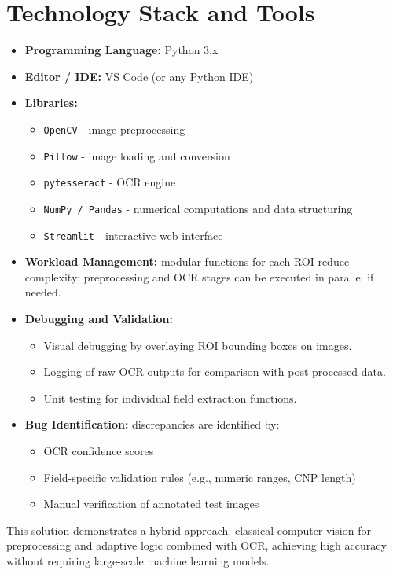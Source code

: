 \documentclass[runningheads,a4paper,11pt]{report}
\begin{document}
\section{Technology Stack and Tools}
\begin{itemize}
\item \textbf{Programming Language:} Python 3.x
\item \textbf{Editor / IDE:} VS Code (or any Python IDE)
\item \textbf{Libraries:} 
  \begin{itemize}
  \item \texttt{OpenCV} - image preprocessing
  \item \texttt{Pillow} - image loading and conversion
  \item \texttt{pytesseract} - OCR engine
  \item \texttt{NumPy / Pandas} - numerical computations and data structuring
  \item \texttt{Streamlit} - interactive web interface
  \end{itemize}
\item \textbf{Workload Management:} modular functions for each ROI reduce complexity; preprocessing and OCR stages can be executed in parallel if needed.
\item \textbf{Debugging and Validation:} 
  \begin{itemize}
  \item Visual debugging by overlaying ROI bounding boxes on images.
  \item Logging of raw OCR outputs for comparison with post-processed data.
  \item Unit testing for individual field extraction functions.
  \end{itemize}
\item \textbf{Bug Identification:} discrepancies are identified by:
  \begin{itemize}
  \item OCR confidence scores
  \item Field-specific validation rules (e.g., numeric ranges, CNP length)
  \item Manual verification of annotated test images
  \end{itemize}
\end{itemize}

\noindent
This solution demonstrates a hybrid approach: classical computer vision for preprocessing and adaptive logic combined with OCR, achieving high accuracy without requiring large-scale machine learning models.
\end{document}
